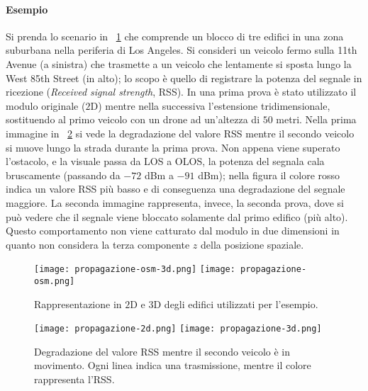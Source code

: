 \paragraph{Esempio} Si prenda lo scenario in \figurename~\ref{fig:propagazione-osm}
che comprende un blocco di tre edifici in una zona suburbana nella periferia di Los Angeles.
Si consideri un veicolo fermo sulla 11th Avenue (a sinistra)
che trasmette a un veicolo che lentamente si sposta lungo la West 85th Street (in alto);
lo scopo è quello di registrare la potenza del segnale in ricezione (\textit{Received signal strength}, RSS).
In una prima prova è stato utilizzato il modulo originale ($2$D) mentre nella successiva
l'estensione tridimensionale, sostituendo al primo veicolo con un drone ad un'altezza di $50$ metri.
Nella prima immagine in \figurename~\ref{fig:propagazione-2d-3d} si vede la degradazione del valore RSS
mentre il secondo veicolo si muove lungo la strada durante la prima prova.
Non appena viene superato l'ostacolo, e la visuale passa da LOS a OLOS, la potenza
del segnala cala bruscamente (passando da $-72$ dBm a $-91$ dBm);
nella figura il colore rosso indica un valore RSS più basso e di conseguenza una degradazione del segnale maggiore.
La seconda immagine rappresenta, invece, la seconda prova, dove si può vedere
che il segnale viene bloccato solamente dal primo edifico (più alto).
Questo comportamento non viene catturato dal modulo in due dimensioni
in quanto non considera la terza componente $z$ della posizione spaziale.
%
\begin{figure}[htbp]
	\centering
	\texttt{[image: propagazione-osm-3d.png]}
		\hfill
	\texttt{[image: propagazione-osm.png]}
\caption{Rappresentazione in $2$D e $3$D degli edifici utilizzati per l'esempio.\label{fig:propagazione-osm}}
\end{figure}
%
\begin{figure}[htbp]
	\centering
	\texttt{[image: propagazione-2d.png]}
	\hfill
	\texttt{[image: propagazione-3d.png]}
\caption{Degradazione del valore RSS mentre il secondo veicolo è in movimento.
Ogni linea indica una trasmissione, mentre il colore rappresenta l'RSS.\label{fig:propagazione-2d-3d}}
\end{figure}
%
